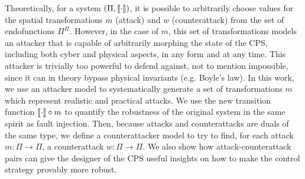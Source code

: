 Theoretically, for a system $(\Pi,{{{\llbracket\cdot\rrbracket}}})$, %
it is possible to arbitrarily choose values for the spatial transformations $m$ (attack) and $w$ (counterattack) from the set of endofunctions $\Pi^{\Pi}$.  However, in the case of $m$, this set of transformations models an attacker that is capable of arbitrarily morphing the state of the CPS, including both cyber and physical aspects, in any form and at any time. This attacker is trivially too powerful to defend against, not to mention impossible, since it can in theory bypass physical invariants (e.g. Boyle's law). In this work, we  use an attacker model to systematically generate a set of transformations $m$ which represent realistic and practical attacks. We use the new transition function ${{{\llbracket\cdot\rrbracket}}}\circ m$ to quantify the robustness of the original system in the same spirit as fault injection. Then, because attacks and counterattacks are duals of the same type, we define a counterattacker model to try to find, for each attack $m\colon\Pi\rightarrow\Pi$, a counterattack $w\colon\Pi\rightarrow\Pi$. We also show how attack-counterattack pairs can give the designer of the CPS useful insights on how to make the control strategy provably more robust. %



